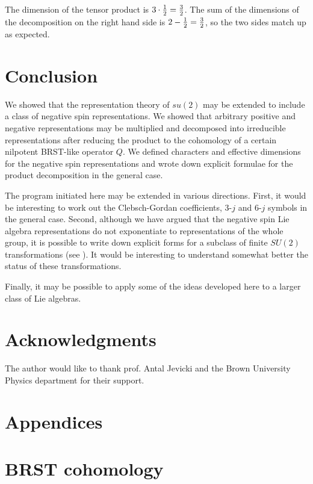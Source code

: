 \documentclass[a4paper,dvips,12pt]{article}
\newcommand {\half} {{1 \over 2}}
\begin{document}
    The dimension of the tensor product is $3\cdot\half = {3\over
    2}$.  The sum of the dimensions of the decomposition on the
    right hand side is $2 - \half = {3\over 2}$, so the two sides
    match up as expected.



    \section{Conclusion}

    We showed that the representation theory of $su(2)$ may be
    extended to include a class of negative spin representations.
    We showed that arbitrary positive and negative representations
    may be multiplied and decomposed into irreducible
    representations after reducing the
    product to the cohomology of a certain nilpotent BRST-like operator
    $Q$.  We defined characters and effective dimensions for the negative spin
    representations and
    wrote down explicit formulae for the product decomposition
    in the general case.

    The program initiated here may be extended in various
    directions.  First, it would be interesting to work out
    the Clebsch-Gordan coefficients, 3-$j$ and 6-$j$ symbols in
    the general case.  Second, although we have argued that the
    negative spin Lie algebra representations do not exponentiate
    to representations of the whole group, it is possible to
    write down explicit forms for a subclass of finite $SU(2)$
    transformations (see \cite{MYSELF}).  It would be interesting
    to understand somewhat better the status of these
    transformations.

    Finally, it may be possible to apply some of the ideas developed
    here to a larger class of Lie algebras.

    \section*{Acknowledgments}

    The author would like to thank prof. Antal Jevicki and the Brown
    University Physics department for their support.

    \section*{Appendices}
    \appendix

    \section{BRST cohomology}
    \label{BRST}
\end{document}
